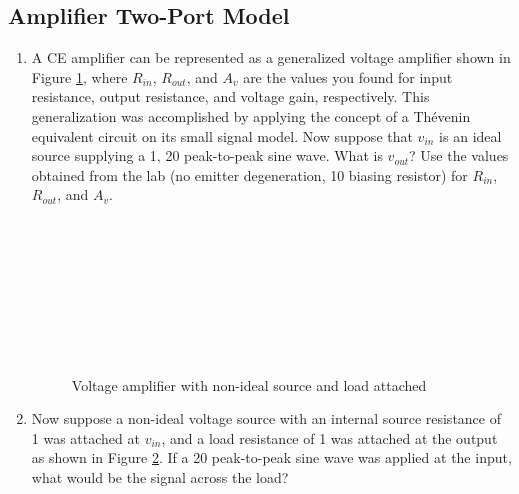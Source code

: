 \documentclass{article}
\begin{document}
\subsection{Amplifier Two-Port Model}
\begin{enumerate}

\begin{figure}[!htb]
	
	\centerline{\box\graph}
	\caption{Generalized voltage amplifier}
	\label{2port}
\end{figure}

\item A CE amplifier can be represented as a generalized voltage amplifier shown in Figure \ref{2port}, where $R_{in}$, $R_{out}$, and $A_v$ are the values you found for input resistance, output resistance, and voltage gain, respectively. This generalization was accomplished by applying the concept of a Th\'{e}venin equivalent circuit on its small signal model. Now suppose that $v_{in}$ is an ideal source supplying a \unit{1}{\kilo\hertz}, \unit{20}{\milli\volt} peak-to-peak sine wave. What is $v_{out}$? Use the values obtained from the lab (no emitter degeneration, \unit{10}{\kilo\ohm} biasing resistor) for $R_{in}$, $R_{out}$, and $A_v$.
\\~\\~\\~\\~\\~\\~\\~\\~\\

\begin{figure}[!htb]
	
	\centerline{\box\graph}
	\caption{Voltage amplifier with non-ideal source and load attached}
	\label{2portload}
\end{figure}

\item Now suppose a non-ideal voltage source with an internal source resistance of \unit{1}{\kilo\ohm} was attached at $v_{in}$, and a load resistance of \unit{1}{\kilo\ohm} was attached at the output as shown in Figure \ref{2portload}. If a \unit{20}{\milli\volt} peak-to-peak sine wave was applied at the input, what would be the signal across the load?
\\~\\~\\~\\~\\~\\~\\~\\~\\


\end{enumerate}
\end{document}

